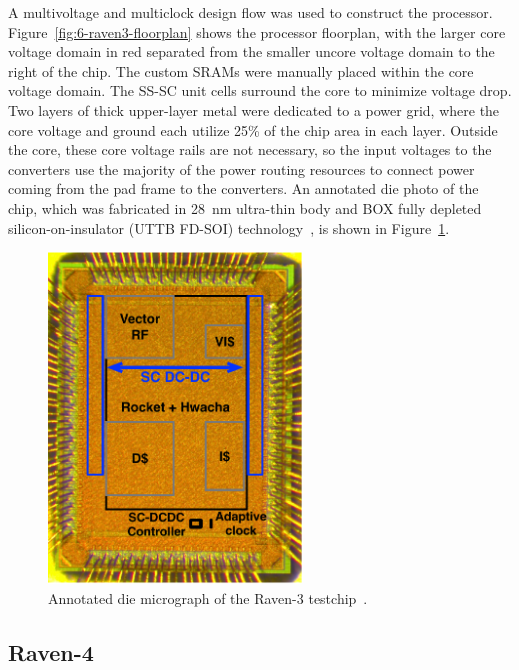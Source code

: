 \documentclass[graybox]{svmult}
\begin{document}
A multivoltage and multiclock design flow was used to construct the processor.
Figure~\ref{fig:6-raven3-floorplan} shows the processor floorplan, with the larger core voltage domain in red separated from the smaller uncore voltage domain to the right of the chip.
The custom SRAMs were manually placed within the core voltage domain.
The SS-SC unit cells surround the core to minimize voltage drop.
Two layers of thick upper-layer metal were dedicated to a power grid, where the core voltage and ground each utilize 25\% of the chip area in each layer.
Outside the core, these core voltage rails are not necessary, so the input voltages to the converters use the majority of the power routing resources to connect power coming from the pad frame to the converters.
An annotated die photo of the chip, which was fabricated in \SI{28}{\nano\meter} ultra-thin body and BOX fully depleted silicon-on-insulator (UTTB FD-SOI) technology~\cite{Flatresse2013}, is shown in Figure~\ref{fig:6-raven3-diephoto}.

\begin{figure}
  \centering
  \includegraphics[width=0.6\textwidth]{6-raven3-diephoto}
  \caption{Annotated die micrograph of the Raven-3 testchip~\cite{Zimmer2016}.}
  \label{fig:6-raven3-diephoto}
\end{figure}



\subsection{Raven-4}
\end{document}
